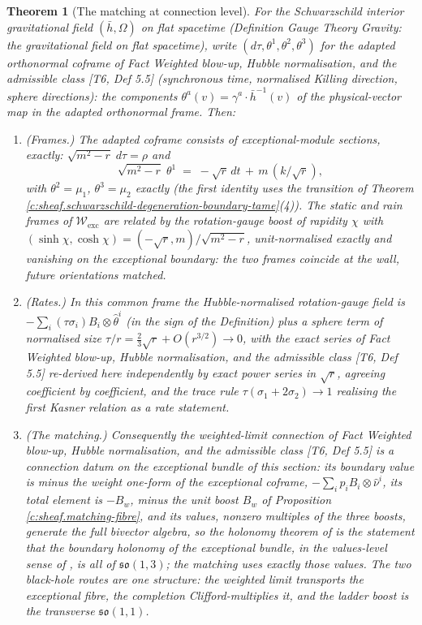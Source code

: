 \documentclass[11pt]{article}
\newtheorem{theorem}{Theorem}[section]
\theoremstyle{definition}
\theoremstyle{plain}
\newcommand{\changedmark}[2]{\marginpar{\raggedright\scriptsize\color{#1}#2}}
\providecommand{\dtPG}{}\renewcommand{\dtPG}{dt}
\providecommand{\hb}{}\renewcommand{\hb}{\bar{h}}
\providecommand{\shW}{}\renewcommand{\shW}{\mathcal{W}}
\begin{document}
\begin{theorem}[The matching at connection level]\label{c:sheaf.matching-connection-level}
\changedmark{BurntOrange}{changed since the deposit}
For the Schwarzschild interior gravitational field $(\hb, \Omega)$ on flat spacetime (Definition \emph{Gauge Theory Gravity: the gravitational field on flat spacetime}), write $(d\tau, \theta^1, \theta^2, \theta^3)$ for the adapted orthonormal coframe of Fact \emph{Weighted blow-up, Hubble normalisation, and the admissible class} [T6, Def 5.5] (synchronous time, normalised Killing direction, sphere directions): the components $\theta^a(v) = \gamma^a \cdot \hb^{-1}(v)$ of the physical-vector map in the adapted orthonormal frame. Then:
\begin{enumerate}
\item \emph{(Frames.)} The adapted coframe consists of exceptional-module sections, exactly: $\sqrt{m^2 - r}\;d\tau = \rho$ and
\[
\sqrt{m^2 - r}\;\theta^1 \;=\; -\sqrt r\,\dtPG \,+\, m\,(k/\sqrt r),
\]
with $\theta^2 = \mu_1$, $\theta^3 = \mu_2$ exactly (the first identity uses the transition of Theorem \ref{c:sheaf.schwarzschild-degeneration-boundary-tame}(4)). The static and rain frames of $\shW_{\mathrm{exc}}$ are related by the rotation-gauge boost of rapidity $\chi$ with $(\sinh\chi, \cosh\chi) = (-\sqrt r, m)/\sqrt{m^2-r}$, unit-normalised exactly and vanishing on the exceptional boundary: the two frames coincide at the wall, future orientations matched.
\item \emph{(Rates.)} In this common frame the Hubble-normalised rotation-gauge field is $-\sum_i (\tau\sigma_i)B_i \otimes \hat\theta^i$ (in the sign of the Definition) plus a sphere term of normalised size $\tau/r = \tfrac23\sqrt r + O(r^{3/2}) \to 0$, with the exact series of Fact \emph{Weighted blow-up, Hubble normalisation, and the admissible class} [T6, Def 5.5] re-derived here independently by exact power series in $\sqrt r$, agreeing coefficient by coefficient, and the trace rule $\tau(\sigma_1 + 2\sigma_2) \to 1$ realising the first Kasner relation as a rate statement.
\item \emph{(The matching.)} Consequently the weighted-limit connection of Fact \emph{Weighted blow-up, Hubble normalisation, and the admissible class} [T6, Def 5.5] is a connection datum on the exceptional bundle of this section: its boundary value is minus the weight one-form of the exceptional coframe, $-\sum_i p_i B_i \otimes \hat\nu^i$, its total element is $-B_w$, minus the unit boost $B_w$ of Proposition \ref{c:sheaf.matching-fibre}, and its values, nonzero multiples of the three boosts, generate the full bivector algebra, so the holonomy theorem of \cite{ButlerT6} is the statement that the boundary holonomy of the exceptional bundle, in the values-level sense of \cite[Def.~5.5]{ButlerT6}, is all of $\mathfrak{so}(1,3)$; the matching uses exactly those values. The two black-hole routes are one structure: the weighted limit transports the exceptional fibre, the completion Clifford-multiplies it, and the ladder boost is the transverse $\mathfrak{so}(1,1)$.
\end{enumerate}
\end{theorem}
\end{document}

